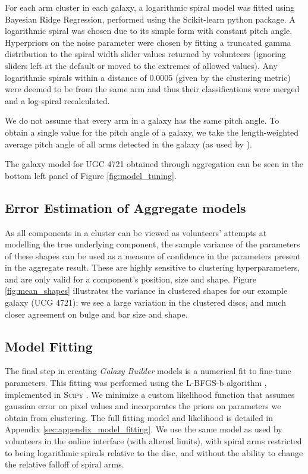 \documentclass[main\.tex]{subfiles}
\begin{document}
For each arm cluster in each galaxy, a logarithmic spiral model was fitted using Bayesian Ridge Regression, performed using the Scikit-learn python package. A logarithmic spiral was chosen due to its simple form with constant pitch angle. Hyperpriors on the noise parameter were chosen by fitting a truncated gamma distribution \citep{2014arXiv1401.0287Z} to the spiral width slider values returned by volunteers (ignoring sliders left at the default or moved to the extremes of allowed values). Any logarithmic spirals within a distance of 0.0005 (given by the clustering metric) were deemed to be from the same arm and thus their classifications were merged and a log-spiral recalculated.

We do not assume that every arm in a galaxy has the same pitch angle. To obtain a single value for the pitch angle of a galaxy, we take the length-weighted average pitch angle of all arms detected in the galaxy (as used by \citealt{Davis2014:1402.1910v1}).

The galaxy model for UGC 4721 obtained through aggregation can be seen in the bottom left panel of Figure \ref{fig:model_tuning}.


\subsection{Error Estimation of Aggregate models}
\label{sec:error_estimation}

As all components in a cluster can be viewed as volunteers' attempts at modelling the true underlying component, the sample variance of the parameters of these shapes can be used as a measure of confidence in the parameters present in the aggregate result. These are highly sensitive to clustering hyperparameters, and are only valid for a component's position, size and shape. Figure \ref{fig:mean_shapes} illustrates the variance in clustered shapes for our example galaxy (UCG 4721); we see a large variation in the clustered discs, and much closer agreement on bulge and bar size and shape.

\subsection{Model Fitting}


The final step in creating \textit{Galaxy Builder} models is a numerical fit to fine-tune parameters. This fitting was performed using the L-BFGS-b algorithm \citep{doi:10.1137/0916069}, implemented in \textsc{Scipy} \citep{scipy-paper}. We minimize a custom likelihood function that assumes gaussian error on pixel values and incorporates the priors on parameters we obtain from clustering. The full fitting model and likelihood is detailed in Appendix \ref{sec:appendix_model_fitting}. We use the same model as used by volunteers in the online interface (with altered limits), with spiral arms restricted to being logarithmic spirals relative to the disc, and without the ability to change the relative falloff of spiral arms.
\end{document}
